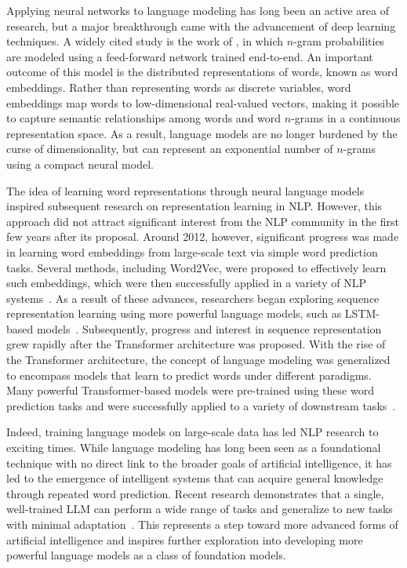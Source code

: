 Applying neural networks to language modeling has long been an active area of research, but a major breakthrough came with the advancement of deep learning techniques. A widely cited study is the work of \citet{Bengio-et-al:2003}, in which $n$-gram probabilities are modeled using a feed-forward network trained end-to-end. An important outcome of this model is the distributed representations of words, known as word embeddings. Rather than representing words as discrete variables, word embeddings map words to low-dimensional real-valued vectors, making it possible to capture semantic relationships among words and word $n$-grams in a continuous representation space. As a result, language models are no longer burdened by the curse of dimensionality, but can represent an exponential number of $n$-grams using a compact neural model.

The idea of learning word representations through neural language models inspired subsequent research on representation learning in NLP. However, this approach did not attract significant interest from the NLP community in the first few years after its proposal. Around 2012, however, significant progress was made in learning word embeddings from large-scale text via simple word prediction tasks. Several methods, including Word2Vec, were proposed to effectively learn such embeddings, which were then successfully applied in a variety of NLP systems~\cite{mikolov:2013efficient,Mikolov-et-al:2013distributed}. As a result of these advances, researchers began exploring sequence representation learning using more powerful language models, such as LSTM-based models~\cite{sutskever-etal:2014sequence,peters-etal:2018deep}. Subsequently, progress and interest in sequence representation grew rapidly after the Transformer architecture was proposed. With the rise of the Transformer architecture, the concept of language modeling was generalized to encompass models that learn to predict words under different paradigms. Many powerful Transformer-based models were pre-trained using these word prediction tasks and were successfully applied to a variety of downstream tasks~\cite{devlin-etal:2019bert}.

Indeed, training language models on large-scale data has led NLP research to exciting times. While language modeling has long been seen as a foundational technique with no direct link to the broader goals of artificial intelligence, it has led to the emergence of intelligent systems that can acquire general knowledge through repeated word prediction. Recent research demonstrates that a single, well-trained LLM can perform a wide range of tasks and generalize to new tasks with minimal adaptation~\cite{bubeck-etal:2023sparks}. This represents a step toward more advanced forms of artificial intelligence and inspires further exploration into developing more powerful language models as a class of foundation models.

